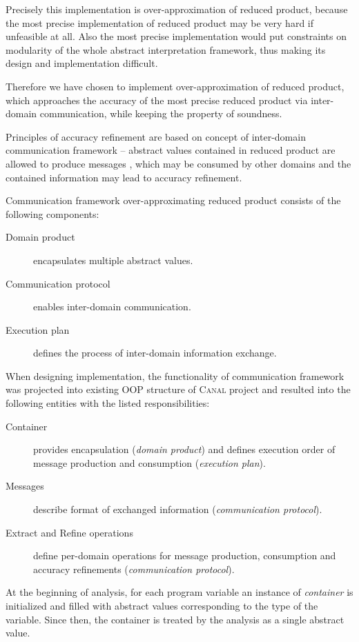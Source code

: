 \documentclass[12pt,oneside]{fithesis2}
\theoremstyle{definition}
\begin{document}
Precisely this implementation is over-approximation of reduced product, because the most precise implementation of reduced product may be very hard if unfeasible at all. Also the most precise implementation would put constraints on modularity of the whole abstract interpretation framework, thus making its design and implementation difficult.

Therefore we have chosen to implement over-approximation of reduced product, which approaches the accuracy of the most precise reduced product via inter-domain communication, while keeping the property of soundness.

Principles of accuracy refinement are based on concept of inter-domain communication framework -- abstract values contained in reduced product are allowed to produce messages , which may be consumed by other domains and the contained information may lead to accuracy refinement.

Communication framework over-approximating reduced product consists of the following components:

\begin{description}
  \item[Domain product] encapsulates multiple abstract values.
  \item[Communication protocol] enables inter-domain communication.
  \item[Execution plan] defines the process of inter-domain information exchange.
\end{description}

When designing implementation, the functionality of communication framework was projected into existing OOP structure of \textsc{Canal} project and resulted into the following entities with the listed responsibilities:

\begin{description}
  \item[Container] provides encapsulation (\textit{domain product}) and defines execution order of message production and consumption (\textit{execution plan}).
  \item[Messages] describe format of exchanged information (\textit{communication protocol}).
  \item[Extract and Refine operations] define per-domain operations for message production, consumption and accuracy refinements (\textit{communication protocol}).
\end{description}

At the beginning of analysis, for each program variable an instance of \textit{container} is initialized and filled with abstract values corresponding to the type of the variable. Since then, the container is treated by the analysis as a single abstract value.
\end{document}

